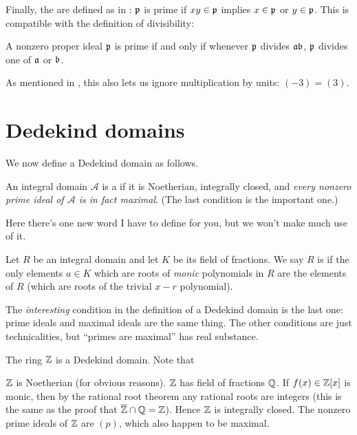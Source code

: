 Finally, the  are defined as in :
$\mathfrak p$ is prime if $xy \in \mathfrak p$ implies $x \in \mathfrak p$ or $y \in \mathfrak p$.
This is compatible with the definition of divisibility:
\begin{exercise}
	A nonzero proper ideal $\mathfrak p$ is prime
	if and only if whenever $\mathfrak p$ divides $\mathfrak a \mathfrak b$,
	$\mathfrak p$ divides one of $\mathfrak a$ or $\mathfrak b$.
\end{exercise}
As mentioned in ,
this also lets us ignore multiplication by units: $(-3) = (3)$.

\section{Dedekind domains}
We now define a Dedekind domain as follows.
\begin{definition}
	An integral domain $\mathcal A$ is a 
	if it is Noetherian, integrally closed, and
	\emph{every nonzero prime ideal of $\mathcal A$ is in fact maximal}.
	(The last condition is the important one.)
\end{definition}
Here there's one new word I have to define for you, but we won't make much use of it.
\begin{definition}
	Let $R$ be an integral domain and let $K$ be its field of fractions.
	We say $R$ is  if
	the only elements $a \in K$ which are roots of \emph{monic} polynomials in $R$
	are the elements of $R$ (which are roots of the trivial $x-r$ polynomial).
\end{definition}
The \emph{interesting} condition in the definition
of a Dedekind domain is the last one: prime ideals and maximal ideals
are the same thing.
The other conditions are just technicalities,
but ``primes are maximal'' has real substance.
\begin{example}
	The ring $\mathbb Z$ is a Dedekind domain.
	Note that
	\begin{itemize}
		\ii $\mathbb Z$ is Noetherian (for obvious reasons).
		\ii $\mathbb Z$ has field of fractions $\mathbb Q$.
		If $f(x) \in \mathbb Z[x]$ is monic, then by the rational root theorem
		any rational roots are integers
		(this is the same as the proof that $\overline{\mathbb Z} \cap \mathbb Q = \mathbb Z$).
		Hence $\mathbb Z$ is integrally closed.
		\ii The nonzero prime ideals of $\mathbb Z$ are $(p)$,
		which also happen to be maximal.
	\end{itemize}
\end{example}

